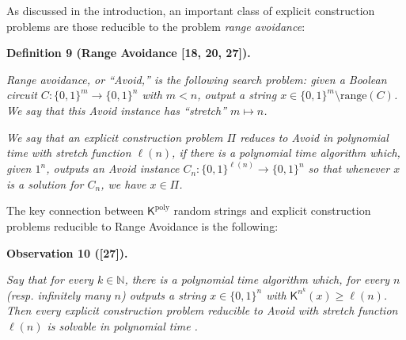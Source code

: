 


As discussed in the introduction, an important class of explicit construction problems are those reducible to the problem \emph{range avoidance}:\par





\par\medskip\noindent\textbf{
\textbf{Definition 9}\textbf{ }(Range Avoidance [18, 20, 27])\textbf{.}
}\par



\emph{Range avoidance, or “Avoid,” is the following search problem: given a Boolean circuit $C:\{0,1\}^{m}\to\{0,1\}^{n}$ with $m<n$, output a string $x\in\{0,1\}^{m}\setminus\mathrm{range}(C)$. We say that this Avoid instance has “stretch” $m\mapsto n$.}\par




\emph{We say that an explicit construction problem $\Pi$ reduces to Avoid in polynomial time with stretch function $\ell(n)$, if there is a polynomial time algorithm which, given $1^{n}$, outputs an Avoid instance $C_{n}:\{0,1\}^{\ell(n)}\to\{0,1\}^{n}$ so that whenever $x$ is a solution for $C_{n}$, we have $x\in\Pi$.}\par






The key connection between ${\mathsf{K}}^{\mathrm{poly}}$ random strings and explicit construction problems reducible to Range Avoidance is the following:\par





\par\medskip\noindent\textbf{
\textbf{Observation 10}\textbf{ }([27])\textbf{.}
}\par



\emph{Say that for every $k\in\mathbb{N}$, there is a polynomial time algorithm which, for every $n$ (resp. infinitely many $n$) outputs a string $x\in\{0,1\}^{n}$ with ${\mathsf{K}}^{n^{k}}(x)\geq\ell(n)$. Then every explicit construction problem reducible to Avoid with stretch function $\ell(n)$ is solvable in polynomial time .}\par




